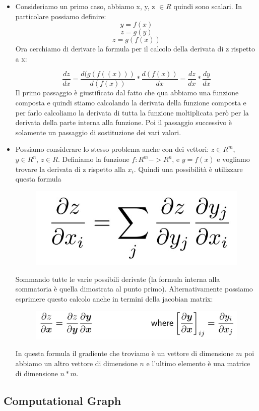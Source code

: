 \documentclass[14pt]{extreport}
\begin{document}
\begin{itemize}
\item Consideriamo un primo caso, abbiamo x, y, z $\in R$ quindi sono scalari. In particolare possiamo definire:
$$y = f(x)$$
$$z = g(y)$$
$$z = g(f(x))$$ Ora cerchiamo di derivare la formula per il calcolo della derivata di z rispetto a x:

$$\frac{dz}{dx}=\frac{d(g(f((x)))}{d(f(x))}*\frac{d(f(x))}{dx} = \frac{dz}{dx}*\frac{dy}{dx}$$ Il primo passaggio è giustificato dal fatto che qua
abbiamo una funzione composta e quindi stiamo calcolando la derivata della funzione composta e per farlo calcoliamo la derivata di tutta la funzione
moltiplicata però per la derivata della parte interna alla funzione. Poi il passaggio successivo è solamente un passaggio di sostituzione dei vari
valori.
\item Possiamo considerare lo stesso problema anche con dei vettori: $z \in R^m$, $y \in R^n$, $z \in R$. Definiamo la funzione $f:R^m -> R^n$, e $y =
f(x)$ e vogliamo trovare la derivata di z rispetto alla $x_i$. Quindi una possibilità è utilizzare questa formula \begin{figure}[H]
\centering
\includegraphics[width=0.7\linewidth]{382.jpeg}
\end{figure}
Sommando tutte le varie possibili derivate (la formula interna alla sommatoria è quella dimostrata al punto primo). Alternativamente possiamo
esprimere questo calcolo anche in termini della jacobian matrix:
\begin{figure}[H]
\centering
\includegraphics[width=0.7\linewidth]{383.jpeg}
\end{figure}
In questa formula il gradiente che troviamo è un vettore di dimensione $m$ poi abbiamo un altro vettore di dimensione $n$ e l'ultimo elemento è una
matrice di dimensione $n*m$.
\end{itemize}


\subsection{Computational Graph}
\end{document}
